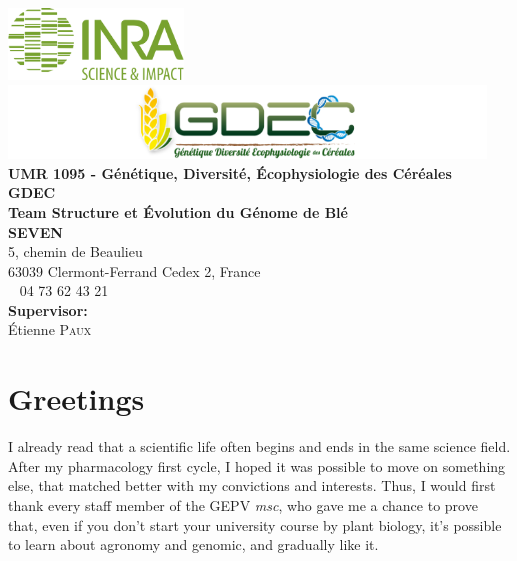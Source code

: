 \documentclass[a4paper, 12pt]{article}
\newcommand{\nocontentsline}[3]{}
\newcommand{\tocless}[2]{\bgroup\let\addcontentsline=\nocontentsline#1{#2}\egroup}
\begin{document}
\begin{onehalfspace}
\begin{titlepage}
\end{titlepage}


\newpage
\thispagestyle{empty}
\begin{center}
  	\includegraphics[width=0.35\textwidth]{logo/logo_inra.jpg}\\
\vspace{2cm}
	\includegraphics[width=0.95\textwidth]{logo/logo_gdec.png}\\
\vspace{2.5cm}
	\large\textbf{UMR 1095 - Génétique, Diversité, Écophysiologie des Céréales \\ 
	\textsc{GDEC}\\
	Team Structure et Évolution du Génome de Blé \\
	\textsc{SEVEN}}\\
	5, chemin de Beaulieu\\
	63039 Clermont-Ferrand Cedex 2, France\\
	\phone ~ 04 73 62 43 21\\
\vspace{3cm}
	\large\textbf{Supervisor:}\\
	Étienne \textsc{Paux}\\
\end{center}


\newpage
\thispagestyle{empty}
\parindent=1.5cm
    \tocless{\part*{Greetings}}
    
\vspace{0.5cm}

I already read that a scientific life often begins and ends in the same science field. After my pharmacology first cycle, I hoped it was possible to move on something else, that matched better with my convictions and interests. Thus, I would first thank every staff member of the GEPV \textit{msc}, who gave me a chance to prove that, even if you don't start your university course by plant biology, it's possible to learn about agronomy and genomic, and gradually like it.


\end{onehalfspace}
\end{document}
